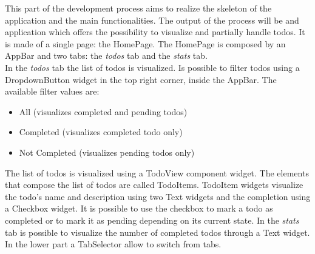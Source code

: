 
This part of the development process aims to realize the skeleton of the application and the main functionalities. The output of the process will be and application which offers the possibility to visualize and partially handle todos. It is made of a single page: the HomePage. The HomePage is composed by an AppBar and two tabs: the \textit{todos} tab and the \textit{stats} tab. \\
In the \textit{todos} tab the list of todos is visualized. Is possible to filter todos using a DropdownButton widget in the top right corner, inside the AppBar. 
The available filter values are:
\begin{itemize}
    \item All (visualizes completed and pending todos)
    \item Completed (visualizes completed todo only)
    \item Not Completed (visualizes pending todos only)
\end{itemize}
The list of todos is visualized using a TodoView component widget. The elements that compose the list of todos are called TodoItems. TodoItem widgets visualize the todo’s name and description using two Text widgets and the completion using a Checkbox widget. It is possible to use the checkbox to mark a todo as completed or to mark it as pending depending on its current state. 
In the \textit{stats} tab is possible to visualize the number of completed todos through a Text widget.
In the lower part a TabSelector allow to switch from tabs.

